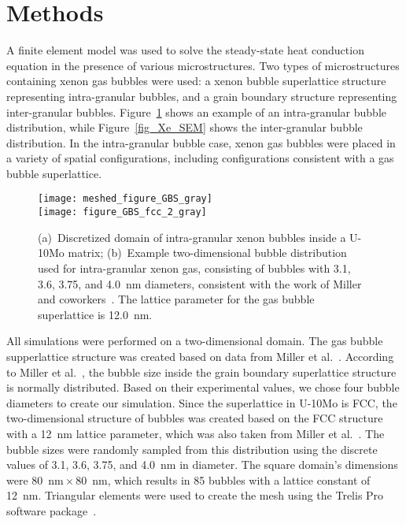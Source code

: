 \section{Methods} \label{sec:Methodology}
A finite element model was used to solve the steady-state heat conduction equation in the presence of various microstructures. Two types of microstructures containing xenon gas bubbles were used: a xenon bubble superlattice structure representing intra-granular bubbles, and a grain boundary structure representing inter-granular bubbles. Figure~\ref{gbs} shows an example of an intra-granular bubble distribution, while Figure~\ref{fig_Xe_SEM} shows the inter-granular bubble distribution.
In the intra-granular bubble case, xenon gas bubbles were placed in a variety
of spatial configurations, including configurations consistent with a gas bubble superlattice.
\begin{figure}%
    \centering
	  \texttt{[image: meshed\_figure\_GBS\_gray]}
    \\
	 \texttt{[image: figure\_GBS\_fcc\_2\_gray]}
	\caption[(a)~Discretized domain of intra-granular xenon bubbles inside a U-10Mo matrix; b)~Example two-dimensional bubble distribution used for intra-granular xenon gas]{(a)~Discretized domain of intra-granular xenon bubbles inside a U-10Mo matrix; (b)~Example two-dimensional bubble distribution 
used for intra-granular xenon gas, consisting of bubbles with 3.1, 3.6, 3.75,
        and 4.0~nm diameters, consistent with the work of Miller and
        coworkers~\cite{miller2015transmission}. The lattice parameter for the
        gas bubble superlattice is 12.0~nm.}
	\label{gbs}
\end{figure}
All simulations were performed on a two-dimensional domain. The gas bubble supperlattice structure was created based on data from Miller et al.~\cite{miller2015transmission}. According to Miller et al.~\cite{miller2015transmission}, the bubble size inside the grain boundary superlattice structure is normally distributed. Based on their experimental values, we chose four bubble diameters to create our simulation. Since the superlattice in U-10Mo is FCC, the two-dimensional structure of bubbles was created based on the FCC structure with a 12~nm lattice parameter, which was also taken from Miller et al.~\cite{miller2015transmission}. The bubble sizes were randomly sampled from this distribution using the discrete values of 3.1, 3.6, 3.75, and 4.0~nm in diameter. The square domain's dimensions were 80~nm${}\times{}$80~nm, which results in 85 bubbles with a lattice constant of 12~nm. Triangular elements were used to create the mesh using the Trelis Pro software package~\cite{trelis}.

